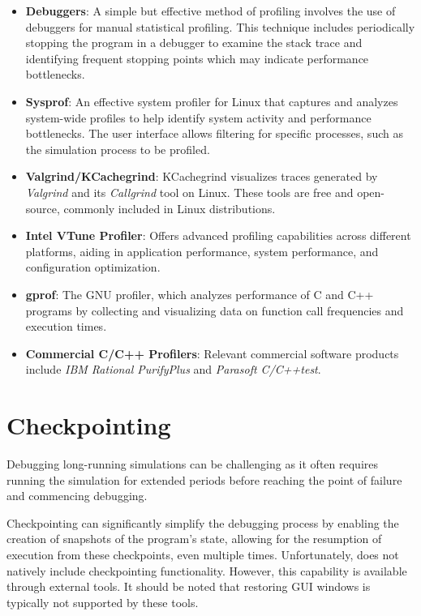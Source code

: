 \begin{itemize}
  \item \textbf{Debuggers}: A simple but effective method of profiling involves
    the use of debuggers for manual statistical profiling. This technique includes
    periodically stopping the program in a debugger to examine the stack trace and
    identifying frequent stopping points which may indicate performance
    bottlenecks.
  \item \textbf{Sysprof}: An effective system profiler for Linux that captures and
    analyzes system-wide profiles to help identify system activity and performance
    bottlenecks. The user interface allows filtering for specific processes, such
    as the simulation process to be profiled.
  \item \textbf{Valgrind/KCachegrind}: KCachegrind visualizes traces generated
    by \textit{Valgrind} and its \textit{Callgrind} tool on Linux. These tools are
    free and open-source, commonly included in Linux distributions.
  \item \textbf{Intel VTune Profiler}: Offers advanced profiling capabilities
    across different platforms, aiding in application performance, system
    performance, and configuration optimization.
  \item \textbf{gprof}: The GNU profiler, which analyzes performance of C and
    C++ programs by collecting and visualizing data on function call
    frequencies and execution times.
  \item \textbf{Commercial C/C++ Profilers}: Relevant commercial software
    products include \textit{IBM Rational PurifyPlus} and \textit{Parasoft
    C/C++test}.
\end{itemize}




\section{Checkpointing}
\label{sec:run-sim:checkpointing}

Debugging long-running simulations can be challenging as it often requires
running the simulation for extended periods before reaching the point of failure
and commencing debugging.

Checkpointing can significantly simplify the debugging process by enabling the
creation of snapshots of the program's state, allowing for the resumption of
execution from these checkpoints, even multiple times. Unfortunately, {\opp}
does not natively include checkpointing functionality. However, this capability
is available through external tools. It should be noted that restoring GUI
windows is typically not supported by these tools.

